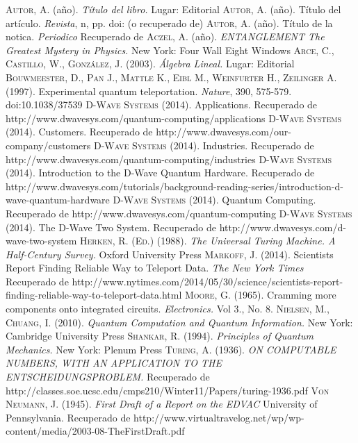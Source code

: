\documentclass[11pt,a4paper]{article}
\begin{document}
\clearpage
\begin{thebibliography}{X}
 \textsc{Autor, A.} (año). \textit{Título del libro.} Lugar: Editorial
 \textsc{Autor, A.} (año). Título del artículo. \textit{Revista}, n, pp. doi: (o recuperado de)
 \textsc{Autor, A.} (año). Título de la notica. \textit{Periodico} Recuperado de
 \textsc{Aczel, A.} (año). \textit{ENTANGLEMENT The Greatest Mystery in Physics.} New York: Four Wall Eight Windows
 \textsc{Arce, C., Castillo, W., González, J.} (2003). \textit{Álgebra Lineal.} Lugar: Editorial
 \textsc{Bouwmeester, D., Pan J., Mattle K., Eibl M., Weinfurter H., Zeilinger A.} (1997). Experimental quantum teleportation. \textit{Nature}, 390, 575-579. doi:10.1038/37539
 \textsc{D-Wave Systems} (2014). Applications. Recuperado de http://www.dwavesys.com/quantum-computing/applications
 \textsc{D-Wave Systems} (2014). Customers. Recuperado de http://www.dwavesys.com/our-company/customers
 \textsc{D-Wave Systems} (2014). Industries. Recuperado de http://www.dwavesys.com/quantum-computing/industries
 \textsc{D-Wave Systems} (2014). Introduction to the D-Wave Quantum Hardware. Recuperado de http://www.dwavesys.com/tutorials/background-reading-series/introduction-d-wave-quantum-hardware
 \textsc{D-Wave Systems} (2014). Quantum Computing. Recuperado de http://www.dwavesys.com/quantum-computing
 \textsc{D-Wave Systems} (2014). The D-Wave Two System. Recuperado de http://www.dwavesys.com/d-wave-two-system
 \textsc{Herken, R. (Ed.)} (1988). \textit{The Universal Turing Machine. A Half-Century Survey.} Oxford University Press
 \textsc{Markoff, J.} (2014). Scientists Report Finding Reliable Way to Teleport Data. \textit{The New York Times} Recuperado de http://www.nytimes.com/2014/05/30/science/scientists-report-finding-reliable-way-to-teleport-data.html
 \textsc{Moore, G.} (1965). Cramming more components onto integrated circuits. \textit{Electronics.} Vol 3., No. 8.
 \textsc{Nielsen, M., Chuang, I.} (2010). \textit{Quantum Computation and Quantum Information.} New York: Cambridge University Press
 \textsc{Shankar, R.} (1994). \textit{Principles of Quantum Mechanics.} New York: Plenum Press
 \textsc{Turing, A.} (1936). \textit{ON COMPUTABLE NUMBERS, WITH AN APPLICATION TO
THE ENTSCHEIDUNGSPROBLEM.} Recuperado de http://classes.soe.ucsc.edu/cmps210/Winter11/Papers/turing-1936.pdf
 \textsc{Von Neumann, J.} (1945). \textit{First Draft of a Report on the EDVAC} University of Pennsylvania. Recuperado de http://www.virtualtravelog.net/wp/wp-content/media/2003-08-TheFirstDraft.pdf
\end{thebibliography}
\end{document}
